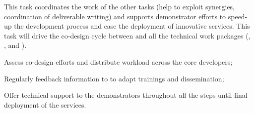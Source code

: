 \begin{task}[
  title=Co-design and technical support,
  id=codesign-support,
  lead=SRL,
  PM=15,
  wphases={0-48},
  partners={XFEL,EGI,CDS,INSERM,QS,SIL,UIO,UPSUD,WTT,EP}
]

This task coordinates the work of the other  tasks (help to exploit synergies, coordination of deliverable writing) and supports demonstrator efforts to speed-up the development process and ease the deployment of innovative services. This task will drive the co-design cycle between  and all the technical work packages (, , and ).

\begin{compactitem}
\item Assess co-design efforts and distribute workload across the core developers;
\item Regularly feedback information to  to adapt trainings and dissemination;
\item Offer technical support to the demonstrators throughout all the steps until final deployment of the services.
\end{compactitem}

\end{task}
